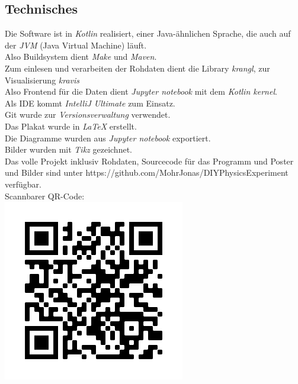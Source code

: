 \documentclass{article}
\begin{document}
\begin{multicols*}{3}
   \section*{Technisches}
   Die Software ist in \emph{Kotlin} realisiert, einer Java-ähnlichen Sprache, die auch auf der \emph{JVM} (Java Virtual Machine) läuft.\\ 
   Also Buildsystem dient \emph{Make} und \emph{Maven}. \\
   Zum einlesen und verarbeiten der Rohdaten dient die Library \emph{krangl}, zur Visualisierung \emph{kravis}\\
   Also Frontend für die Daten dient \emph{Jupyter notebook} mit dem \emph{Kotlin kernel}. \\
   Als IDE kommt \emph{IntelliJ Ultimate} zum Einsatz.\\
   Git wurde zur \emph{Versionsverwaltung} verwendet.\\
   Das Plakat wurde in \emph{\LaTeX} erstellt.\\
   Die Diagramme wurden aus \emph{Jupyter notebook} exportiert.\\
   Bilder wurden mit \emph{Tikz} gezeichnet.\\
   Das volle Projekt inklusiv Rohdaten, Sourcecode für das Programm und Poster und Bilder sind unter https://github.com/MohrJonas/DIYPhysicsExperiment verfügbar.\\
   Scannbarer QR-Code:\\
   \includegraphics[scale=.5]{../images/qr_code}
\end{multicols*}
\end{document}

